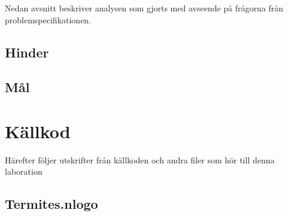 \documentclass[titlepage, a4paper, 12pt]{article}
\begin{document}
Nedan avsnitt beskriver analysen som gjorts med avseende på frågorna
från problemspecifikationen.

\subsection{Hinder}
\subsection{Mål}

\newpage
\appendix
{}
\section{Källkod}\label{sec:kallkod}
Härefter följer utskrifter från källkoden och andra filer som hör till
denna laboration

\subsection{Termites.nlogo}\label{Termites.nlogo}
\begin{footnotesize}
  
\end{footnotesize}
\end{document}
